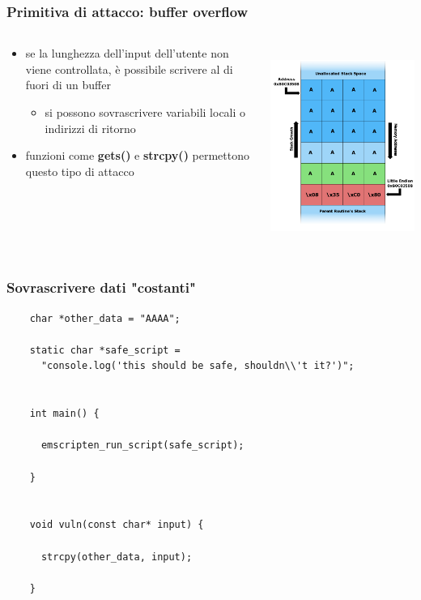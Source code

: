 \documentclass{beamer}
\newcommand\Fontvi{\fontsize{9.5}{7.2}\selectfont}
\begin{document}
\begin{frame}
  \frametitle{Primitiva di attacco: buffer overflow}
  \begin{columns}
    \begin{column}{0.6\textwidth}
      \begin{itemize}
        \item se la lunghezza dell'input dell'utente non viene controllata,
          è possibile scrivere al di fuori di un buffer
        \begin{itemize}
          \item si possono sovrascrivere variabili locali o indirizzi di
            ritorno
        \end{itemize}
        \item funzioni come \textbf{gets()} e \textbf{strcpy()} permettono questo tipo di attacco  
      \end{itemize} 
    \end{column}
    \begin{column}{0.4\textwidth}
      \centerline{\includegraphics[width=10cm,height=6.5cm,keepaspectratio]{images/stack.png}}
    \end{column}
  \end{columns}
\end{frame}

\begin{frame}[fragile]
  \frametitle{Sovrascrivere dati "costanti"}
  \Fontvi
  \begin{verbatim}
    char *other_data = "AAAA";

    static char *safe_script = 
      "console.log('this should be safe, shouldn\\'t it?')";


    int main() {
       
      emscripten_run_script(safe_script);
    
    }


    void vuln(const char* input) {
    
      strcpy(other_data, input);

    }
  \end{verbatim}
\end{frame}
\end{document}
